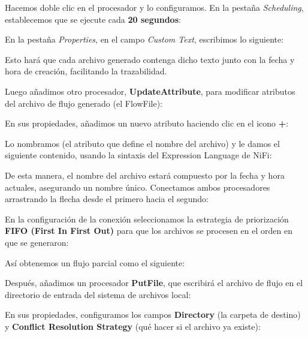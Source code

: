 \documentclass{../../miPlantilla}
\begin{document}

\newpage

Hacemos doble clic en el procesador y lo configuramos. En la pestaña \textit{Scheduling}, establecemos que se ejecute cada \textbf{20 segundos}:


En la pestaña \textit{Properties}, en el campo \textit{Custom Text}, escribimos lo siguiente:


Esto hará que cada archivo generado contenga dicho texto junto con la fecha y hora de creación, facilitando la trazabilidad.  

Luego añadimos otro procesador, \textbf{UpdateAttribute}, para modificar atributos del archivo de flujo generado (el FlowFile):


\newpage

En sus propiedades, añadimos un nuevo atributo haciendo clic en el icono \textbf{+}:


Lo nombramos  (el atributo que define el nombre del archivo) y le damos el siguiente contenido, usando la sintaxis del Expression Language de NiFi:


De esta manera, el nombre del archivo estará compuesto por la fecha y hora actuales, asegurando un nombre único. 
Conectamos ambos procesadores arrastrando la flecha desde el primero hacia el segundo:


En la configuración de la conexión seleccionamos la estrategia de priorización \textbf{FIFO (First In First Out)} para que los archivos se procesen en el orden en que se generaron:


Así obtenemos un flujo parcial como el siguiente:


Después, añadimos un procesador \textbf{PutFile}, que escribirá el archivo de flujo en el directorio de entrada del sistema de archivos local:


\newpage

En sus propiedades, configuramos los campos \textbf{Directory} (la carpeta de destino) y \textbf{Conflict Resolution Strategy} (qué hacer si el archivo ya existe):
\end{document}
